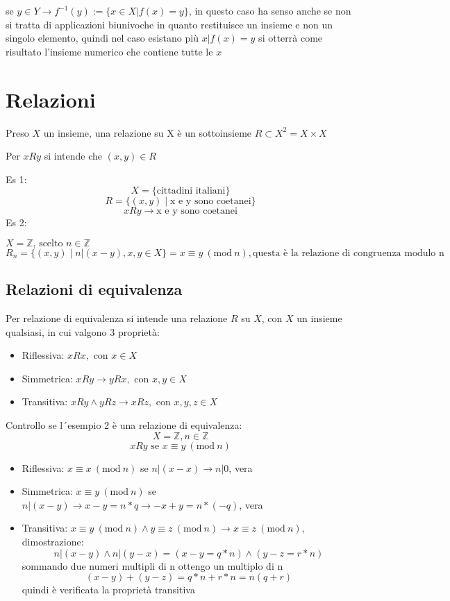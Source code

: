 \documentclass[a4paper,12pt]{article}
\newcommand{\rel}[1][R]{R}
\newcommand{\Mod}[1]{\ (\mathrm{mod}\ #1)}
\begin{document}
	se $y \in Y \rightarrow f^{-1}(y) := \{x \in X | f(x) = y\}$, in questo caso ha senso anche se non si tratta di applicazioni biunivoche in quanto restituisce un insieme e non un singolo elemento, quindi nel caso esistano più $x | f(x) = y$ si otterrà come risultato l'insieme numerico che contiene tutte le $x$
	
	\section{Relazioni}
	Preso $X$ un insieme, una relazione su X è un sottoinsieme $\rel \subset X^2 = X \times X$ 
	
	Per $x \rel y$ si intende che $(x, y)\in \rel$
	
	Es 1: 
	\[
	X = \{\text{cittadini italiani}\}
	\]
	\[
	\rel = \{(x, y) \mid \text{x e y sono coetanei}\}
	\]
	\[
	x\rel y \rightarrow \text{x e y sono coetanei}
	\]
	Es 2:
	
	$X = \mathbb{Z} \text{, scelto } n \in \mathbb{Z}$
	\[
	\rel_n = \{(x, y) \mid n|(x - y), x,y \in X\} = x \equiv y \Mod{n}, \text{questa è la relazione di congruenza modulo n}
	\]
	
	\subsection{Relazioni di equivalenza}
	Per relazione di equivalenza si intende una relazione $\rel$ su $X$, con $X$ un insieme qualsiasi, in cui valgono 3 proprietà:
	\begin{itemize}
		\item Riflessiva: $x \rel x, \text{ con } x \in X$
		\item Simmetrica: $x \rel y \rightarrow y \rel x, \text{ con } x,y \in X$
		\item Transitiva: $x \rel y \wedge y \rel z \rightarrow x \rel z, \text{ con } x,y,z \in X$
	\end{itemize}
	Controllo se l´esempio 2 è una relazione di equivalenza:
	\[
	X = \mathbb{Z}, n\in \mathbb{Z}
	\]
	\[
	x \rel y \text{ se } x \equiv y \Mod n
	\]
	\begin{itemize}
		\item Riflessiva: $x \equiv x \Mod n$ se $n|(x - x) \rightarrow n|0$, vera
		\item Simmetrica: $x \equiv y \Mod n$ se $n|(x - y) \rightarrow x-y = n*q \rightarrow -x + y = n * (-q)$, vera
		\item Transitiva: $x \equiv y \Mod n \wedge y \equiv z \Mod n \rightarrow x \equiv z \Mod{n}$, dimostrazione:
		\[
		n|(x-y) \wedge n|(y - x) = (x - y = q * n) \wedge (y - z = r * n)
		\]
		sommando due numeri multipli di n ottengo un multiplo di n
		\[
		(x -y) + (y -z) = q * n + r * n = n (q+r)
		\]
		quindi è verificata la proprietà transitiva
	\end{itemize}
	
\end{document}
